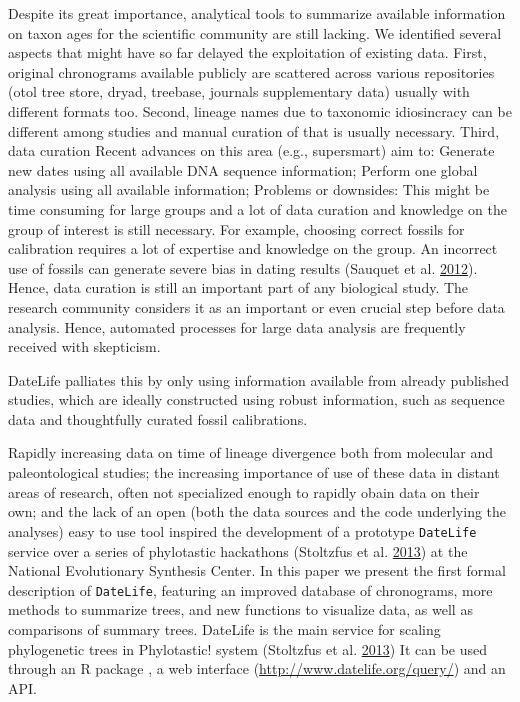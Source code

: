 \documentclass[]{article}
\begin{document}
Despite its great importance, analytical tools to summarize available information
on taxon ages for the scientific community are still lacking.
We identified several aspects that might have so far delayed the exploitation of
existing data. First, original chronograms available publicly are scattered across
various repositories (otol tree store, dryad, treebase, journals supplementary data)
usually with different formats too.
Second, lineage names due to taxonomic idiosincracy can be different among studies
and manual curation of that is usually necessary.
Third, data curation
Recent advances on this area (e.g., supersmart) aim to:
Generate new dates using all available DNA sequence information;
Perform one global analysis using all available information;
Problems or downsides: This might be time consuming for large groups and a lot of
data curation and knowledge on the group of interest is still necessary. For example,
choosing correct fossils for calibration
requires a lot of expertise and knowledge on the group. An incorrect use of fossils
can generate severe bias in dating results (Sauquet et al. \protect\hyperlink{ref-Sauquet2012c}{2012}).
Hence, data curation is still an important part of any biological study. The research
community considers it as an important or even crucial step before data analysis.
Hence, automated processes for large data analysis are frequently received with skepticism.

DateLife palliates this by only using information available from already published
studies, which are ideally constructed using robust information, such as sequence
data and thoughtfully curated fossil calibrations.

Rapidly increasing data on time of lineage divergence both from molecular and paleontological studies; the increasing importance of use of these data in distant areas of research, often not specialized enough to rapidly obain data on their own; and the lack of an open (both the data sources and the code underlying the analyses) easy to use tool
inspired the development of a prototype \texttt{DateLife} service over a series
of phylotastic hackathons (Stoltzfus et al. \protect\hyperlink{ref-Stoltzfus2013}{2013}) at the National Evolutionary Synthesis Center.
In this paper we present the first formal description of \texttt{DateLife}, featuring an improved database of chronograms, more methods to summarize trees, and new functions to visualize data, as well as comparisons of summary trees.
DateLife is the main service for scaling phylogenetic trees in Phylotastic! system
(Stoltzfus et al. \protect\hyperlink{ref-Stoltzfus2013}{2013})
It can be used through an R package , a web interface
(\url{http://www.datelife.org/query/}) and an API.
\end{document}
